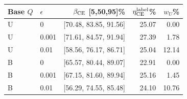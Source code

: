 \begin{tabular}{llrrr}
\toprule
Base $Q$ & $\epsilon$ & $\beta_{\rm CE}$ [5,50,95]\% & $\eta_{\rm CE}^{\rm label}$\% & $w_U$\% \\
\midrule
U & 0 & [70.48, 83.85, 91.56] & 25.07 & 0.00 \\
U & 0.001 & [71.61, 84.57, 91.94] & 27.39 & 1.78 \\
U & 0.01 & [58.56, 76.17, 86.71] & 25.04 & 12.14 \\
B & 0 & [65.57, 80.44, 89.07] & 22.91 & 0.00 \\
B & 0.001 & [67.15, 81.60, 89.94] & 25.16 & 1.45 \\
B & 0.01 & [56.29, 74.55, 85.48] & 24.10 & 10.76 \\
\bottomrule
\end{tabular}
